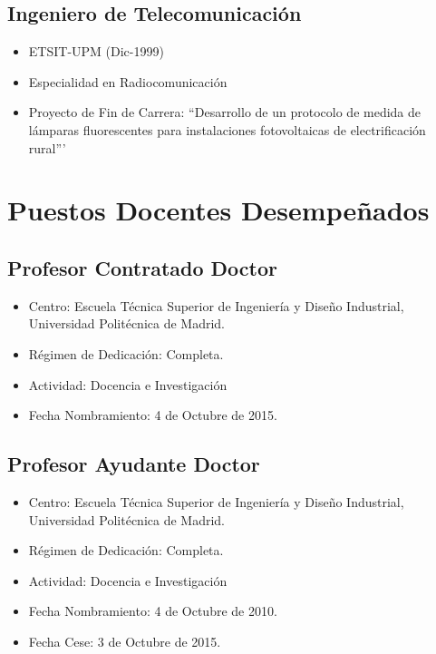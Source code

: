 \documentclass[article, a4paper]{memoir}
\begin{document}
\subsection{Ingeniero de Telecomunicación}
\label{sec-2-2}
\begin{itemize}
\item ETSIT-UPM (Dic-1999)
\item Especialidad en Radiocomunicación
\item Proyecto de Fin de Carrera: ``Desarrollo de un protocolo de medida de lámparas fluorescentes para instalaciones fotovoltaicas de electrificación rural'''
\end{itemize}

\newpage
\section{Puestos Docentes Desempeñados}
\label{sec-3}

\subsection{Profesor Contratado Doctor}
\label{sec-3-1}
\begin{itemize}
\item Centro: Escuela Técnica Superior de Ingeniería y Diseño Industrial, Universidad Politécnica de Madrid.
\item Régimen de Dedicación: Completa.
\item Actividad: Docencia e Investigación
\item Fecha Nombramiento: 4 de Octubre de 2015.
\end{itemize}

\subsection{Profesor Ayudante Doctor}
\label{sec-3-2}
\begin{itemize}
\item Centro: Escuela Técnica Superior de Ingeniería y Diseño Industrial, Universidad Politécnica de Madrid.
\item Régimen de Dedicación: Completa.
\item Actividad: Docencia e Investigación
\item Fecha Nombramiento: 4 de Octubre de 2010.
\item Fecha Cese: 3 de Octubre de 2015.
\end{itemize}
\end{document}
